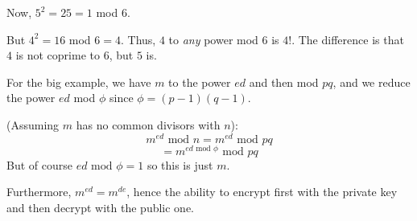 \documentclass[11pt, oneside]{article}
\begin{document}
Now, $5^2 = 25 = 1$ mod $6$. 

 But $4^2 = 16$ mod $6 = 4$.  Thus, $4$ to \emph{any} power mod $6$ is $4$!.  The difference is that $4$ is not coprime to $6$, but $5$ is.

For the big example, we have $m$  to the power $ed$ and then mod $pq$, and we reduce the power $ed$ mod $\phi$ since $\phi = (p-1)(q-1)$.

(Assuming $m$ has no common divisors with $n$):
\[ m^{ed} \text{ mod } n = m^{ed} \text{ mod } pq \]
\[ = m^{ed \text{ mod } \phi} \text{ mod } pq \]
But of course $ed \text{ mod } \phi = 1$ so this is just $m$.

Furthermore, $m^{ed} = m^{de}$, hence the ability to encrypt first with the private key and then decrypt with the public one.
\end{document}
